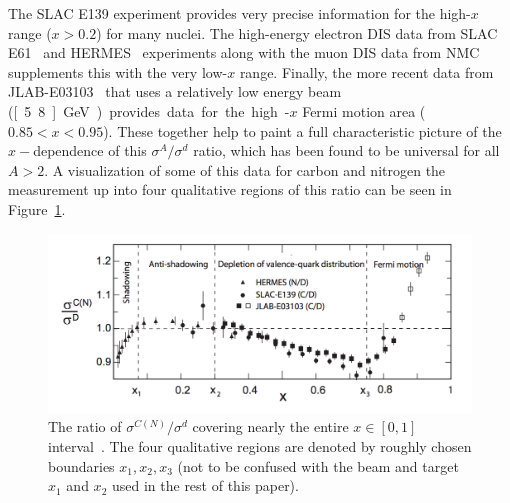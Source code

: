 The SLAC E139 experiment provides very precise information for the high-$x$ range ($x>0.2$) for many nuclei. The high-energy electron DIS data from SLAC E61~\cite{Stein:1975yy} and HERMES~\cite{Ackerstaff:1999ac} experiments along with the muon DIS data from NMC~\cite{Amaudruz:1991nw} supplements this with the very low-$x$ range. Finally, the more recent data from JLAB-E03103~\cite{Seely:2009gt} that uses a relatively low energy beam (\unit[5.8]{GeV}) provides data for the high-$x$ Fermi motion area ($0.85<x<0.95$). These together help to paint a full characteristic picture of the $x-$dependence of this $\sigma^A/\sigma^d$ ratio, which has been found to be universal for all $A>2$. A visualization of some of this data for carbon and nitrogen  the measurement up into four qualitative regions of this ratio can be seen in Figure~\ref{fig:emc-regions}.
\begin{figure}
	\centering
	\includegraphics[width=\textwidth]{figures/background/emc-regions.png}
	\caption{The ratio of $\sigma^{C(N)}/\sigma^d$ covering nearly the entire $x\in[0,1]$ interval~\cite{Rith:2014tma}. The four qualitative regions are denoted by roughly chosen boundaries $x_1, x_2, x_3$ (not to be confused with the beam and target $x_1$ and $x_2$ used in the rest of this paper).}
	\label{fig:emc-regions}
\end{figure}
